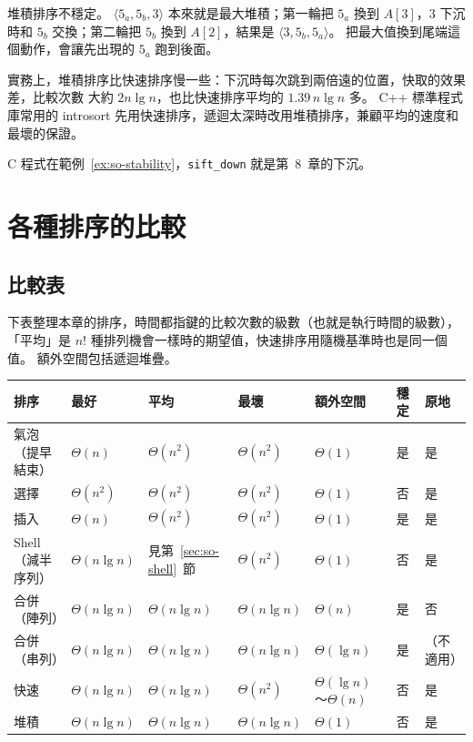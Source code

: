 堆積排序不穩定。 $\langle 5_a, 5_b, 3 \rangle$ 本來就是最大堆積；第一輪把 $5_a$ 換到
$A[3]$，$3$ 下沉時和 $5_b$ 交換；第二輪把 $5_b$ 換到 $A[2]$，結果是 $\langle 3, 5_b, 5_a
\rangle$。 把最大值換到尾端這個動作，會讓先出現的 $5_a$ 跑到後面。

實務上，堆積排序比快速排序慢一些：下沉時每次跳到兩倍遠的位置，快取的效果差，比較次數
大約 $2n \lg n$，也比快速排序平均的 $1.39\, n \lg n$ 多。 C++ 標準程式庫常用的 introsort
先用快速排序，遞迴太深時改用堆積排序，兼顧平均的速度和最壞的保證。

C 程式在範例~\ref{ex:so-stability}，\texttt{sift\_down} 就是第~8~章的下沉。

\section{各種排序的比較}
\label{sec:so-compare}

\subsection{比較表}

下表整理本章的排序，時間都指鍵的比較次數的級數（也就是執行時間的級數），「平均」是
$n!$ 種排列機會一樣時的期望值，快速排序用隨機基準時也是同一個值。 額外空間包括遞迴堆疊。

\begin{center}
\small
\begin{tabular}{lllllll}
\toprule
排序 & 最好 & 平均 & 最壞 & 額外空間 & 穩定 & 原地 \\
\midrule
氣泡（提早結束） & $\Theta(n)$ & $\Theta(n^2)$ & $\Theta(n^2)$ & $\Theta(1)$ & 是 & 是 \\
選擇 & $\Theta(n^2)$ & $\Theta(n^2)$ & $\Theta(n^2)$ & $\Theta(1)$ & 否 & 是 \\
插入 & $\Theta(n)$ & $\Theta(n^2)$ & $\Theta(n^2)$ & $\Theta(1)$ & 是 & 是 \\
Shell（減半序列） & $\Theta(n \lg n)$ & 見第~\ref{sec:so-shell}~節 & $\Theta(n^2)$ & $\Theta(1)$ & 否 & 是 \\
合併（陣列） & $\Theta(n \lg n)$ & $\Theta(n \lg n)$ & $\Theta(n \lg n)$ & $\Theta(n)$ & 是 & 否 \\
合併（串列） & $\Theta(n \lg n)$ & $\Theta(n \lg n)$ & $\Theta(n \lg n)$ & $\Theta(\lg n)$ & 是 & （不適用） \\
快速 & $\Theta(n \lg n)$ & $\Theta(n \lg n)$ & $\Theta(n^2)$ & $\Theta(\lg n)$～$\Theta(n)$ & 否 & 是 \\
堆積 & $\Theta(n \lg n)$ & $\Theta(n \lg n)$ & $\Theta(n \lg n)$ & $\Theta(1)$ & 否 & 是 \\
\bottomrule
\end{tabular}
\end{center}

